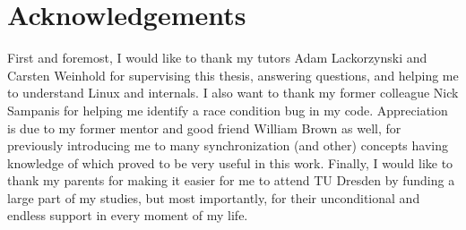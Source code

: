 \chapter*{\centering Acknowledgements}

First and foremost, I would like to thank my tutors Adam Lackorzynski and
Carsten Weinhold for supervising this thesis, answering questions, and helping
me to understand Linux and \llinux internals. I also want to thank my former
colleague Nick Sampanis for helping me identify a race condition bug in my
code. Appreciation is due to my former mentor and good friend William Brown as
well, for previously introducing me to many synchronization (and other)
concepts having knowledge of which proved to be very useful in this work.
Finally, I would like to thank my parents for making it easier for me to attend
TU Dresden by funding a large part of my studies, but most importantly, for
their unconditional and endless support in every moment of my life.
